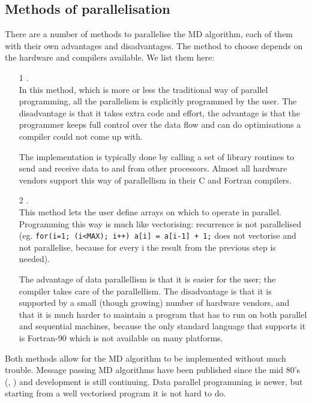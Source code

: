 \subsection{Methods of parallelisation}
There are a number of methods to parallelise the MD algorithm, each of
them with their own advantages and disadvantages. The method to 
choose depends on the hardware and compilers available.
We list them here:
\begin{enumerate}
\item[1]	{\em {}.}\\
		In this method, which is more or less the traditional
		way of parallel programming, all the parallelism is
		explicitly programmed by the user. The disadvantage
		is that it takes extra code and effort, the advantage
		is that the programmer keeps full control over the data
		flow and can do optimisations a compiler could not come 
		up with. 

		The implementation is typically done by calling a set of 
		library routines to send and receive data to and from 
		other processors. Almost all hardware vendors support 
		this way of
		parallellism in their C and Fortran compilers.
		
\item[2]	{\em {}.}\\
		This method lets the user define arrays on which to
		operate in parallel. Programming this way is much
		like vectorising: recurrence is not parallelised
		(eg. {\tt for(i=1; (i<MAX); i++) a[i] = a[i-1] + 1;}
		does not vectorise and not parallelise, because for
		every i the result from the previous step is needed).

		The advantage of data parallellism is that it is
		easier for the user; the compiler takes care of the
		parallellism. The disadvantage is that it is supported
		by a small (though growing) number of hardware vendors,
		and that it is much harder to maintain a program that has to
		run on both parallel and sequential machines, because
		the only standard language that supports it is Fortran-90
		which is not available on many platforms.
\end{enumerate}
Both methods allow for the MD algorithm to be implemented without much
trouble. Message passing MD algorithms have been published
since the mid 80's (\cite{Fincham87}, \cite{Raine89}) 
and development is still continuing. 
Data parallel programming is newer,
but starting from a well vectorised program it is not hard to do.

